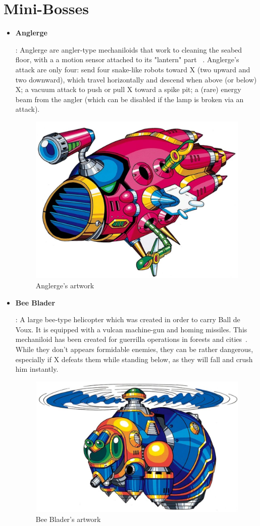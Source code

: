 \section{Mini-Bosses}
	\begin{itemize}
		\item \hypertarget{miniboss:Anglerge}{\textbf{Anglerge}}:
		Anglerge are angler-type mechaniloids that work to cleaning the seabed floor, with a  a motion sensor attached to its "lantern" part ~\cite{wayback:X_resources}. Anglerge's attack are only four: send four snake-like robots toward X (two upward and two downward), which travel horizontally and descend when above (or below) X; a vacuum attack to push or pull X toward a spike pit; a (rare) energy beam from the angler (which can be disabled if the lamp is broken via an attack).
		\begin{figure}[htp]
			\centering
			\includegraphics[width=0.5\linewidth]{figures/X1/Enemies/Anglerge.jpg}
			\caption{Anglerge's artwork}
		\end{figure}
	
		\item \hypertarget{miniboss:Bee_Blader}{\textbf{Bee Blader}}:
		A large bee-type helicopter which was created in order to carry Ball de Voux. It is equipped with a vulcan machine-gun and homing missiles. This mechaniloid has been created for guerrilla operations in forests and cities~\cite{wayback:X_resources}. While they don't appears formidable enemies, they can be rather dangerous, especially if X defeats them while standing below, as they will fall and crush him instantly.
		\begin{figure}[htp]
			\centering
			\includegraphics[width=0.6\linewidth]{figures/X1/Enemies/BeeBlader.jpg}
			\caption{Bee Blader's artwork}
		\end{figure}
	

\end{itemize}
